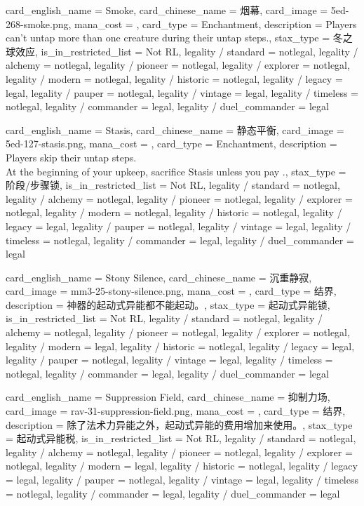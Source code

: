 \documentclass[lang = cn, color = black, 10pt]{AllThatStax}
\begin{document}
\card
{
	card_english_name = {Smoke},
	card_chinese_name = {烟幕},
	card_image = 5ed-268-smoke.png,
	mana_cost = ,
	card_type = Enchantment,
	description = {Players can't untap more than one creature during their untap steps.},
	stax_type = 冬之球效应,
	is_in_restricted_list = Not RL,
	legality / standard = notlegal,
	legality / alchemy = notlegal,
	legality / pioneer = notlegal,
	legality / explorer = notlegal,
	legality / modern = notlegal,
	legality / historic = notlegal,
	legality / legacy = legal,
	legality / pauper = notlegal,
	legality / vintage = legal,
	legality / timeless = notlegal,
	legality / commander = legal,
	legality / duel_commander = legal
}

\card
{
	card_english_name = {Stasis},
	card_chinese_name = {静态平衡},
	card_image = 5ed-127-stasis.png,
	mana_cost = ,
	card_type = Enchantment,
	description = {Players skip their untap steps.\\
		At the beginning of your upkeep, sacrifice Stasis unless you pay .},
	stax_type = 阶段/步骤锁,
	is_in_restricted_list = Not RL,
	legality / standard = notlegal,
	legality / alchemy = notlegal,
	legality / pioneer = notlegal,
	legality / explorer = notlegal,
	legality / modern = notlegal,
	legality / historic = notlegal,
	legality / legacy = legal,
	legality / pauper = notlegal,
	legality / vintage = legal,
	legality / timeless = notlegal,
	legality / commander = legal,
	legality / duel_commander = legal
}

\card
{
	card_english_name = {Stony Silence},
	card_chinese_name = {沉重静寂},
	card_image = mm3-25-stony-silence.png,
	mana_cost = ,
	card_type = 结界,
	description = {神器的起动式异能都不能起动。},
	stax_type = 起动式异能锁,
	is_in_restricted_list = Not RL,
	legality / standard = notlegal,
	legality / alchemy = notlegal,
	legality / pioneer = notlegal,
	legality / explorer = notlegal,
	legality / modern = legal,
	legality / historic = notlegal,
	legality / legacy = legal,
	legality / pauper = notlegal,
	legality / vintage = legal,
	legality / timeless = notlegal,
	legality / commander = legal,
	legality / duel_commander = legal
}

\card
{
	card_english_name = {Suppression Field},
	card_chinese_name = {抑制力场},
	card_image = rav-31-suppression-field.png,
	mana_cost = ,
	card_type = 结界,
	description = {除了法术力异能之外，起动式异能的费用增加来使用。},
	stax_type = 起动式异能税,
	is_in_restricted_list = Not RL,
	legality / standard = notlegal,
	legality / alchemy = notlegal,
	legality / pioneer = notlegal,
	legality / explorer = notlegal,
	legality / modern = legal,
	legality / historic = notlegal,
	legality / legacy = legal,
	legality / pauper = notlegal,
	legality / vintage = legal,
	legality / timeless = notlegal,
	legality / commander = legal,
	legality / duel_commander = legal
}
\end{document}
